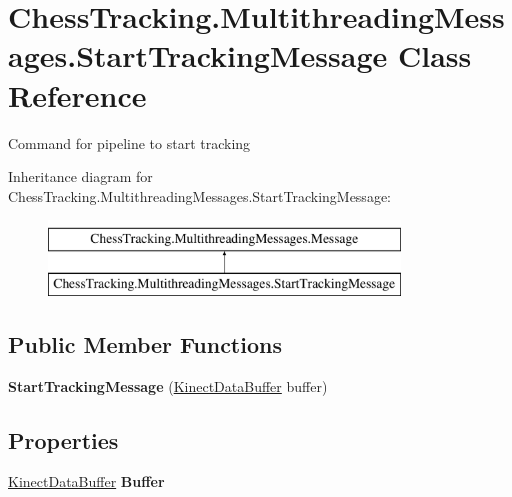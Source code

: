 \hypertarget{class_chess_tracking_1_1_multithreading_messages_1_1_start_tracking_message}{}\section{Chess\+Tracking.\+Multithreading\+Messages.\+Start\+Tracking\+Message Class Reference}
\label{class_chess_tracking_1_1_multithreading_messages_1_1_start_tracking_message}


Command for pipeline to start tracking  


Inheritance diagram for Chess\+Tracking.\+Multithreading\+Messages.\+Start\+Tracking\+Message\+:\begin{figure}[H]
\begin{center}
\leavevmode
\includegraphics[height=2.000000cm]{class_chess_tracking_1_1_multithreading_messages_1_1_start_tracking_message}
\end{center}
\end{figure}
\subsection*{Public Member Functions}
\begin{DoxyCompactItemize}
\item 
\mbox{\label{class_chess_tracking_1_1_multithreading_messages_1_1_start_tracking_message_a618a4bca5544cec6babf1937a668277f}} 
{\bfseries Start\+Tracking\+Message} (\mbox{\hyperlink{class_chess_tracking_1_1_image_processing_1_1_pipeline_data_1_1_kinect_data_buffer}{Kinect\+Data\+Buffer}} buffer)
\end{DoxyCompactItemize}
\subsection*{Properties}
\begin{DoxyCompactItemize}
\item 
\mbox{\label{class_chess_tracking_1_1_multithreading_messages_1_1_start_tracking_message_a06c7ec38b9c0bd1735a92073f307b8be}} 
\mbox{\hyperlink{class_chess_tracking_1_1_image_processing_1_1_pipeline_data_1_1_kinect_data_buffer}{Kinect\+Data\+Buffer}} {\bfseries Buffer}
\end{DoxyCompactItemize}


